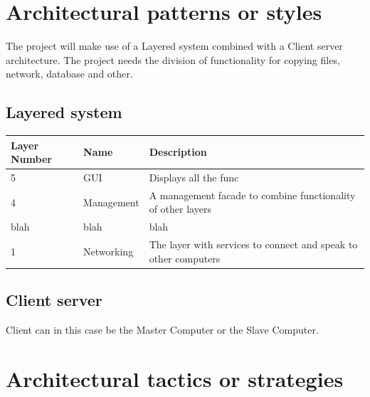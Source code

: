 \documentclass[a4paper,12pt,final]{article}
\begin{document}
\section{Architectural patterns or styles}
The project will make use of a Layered system combined with a Client server architecture. The project  needs the division of functionality for copying files, network, database and other.
\vspace{6pt}\newline
\subsection{Layered system}
\begin{tabular}{|l|l|p{8cm}|}   
\hline
Layer Number & Name & Description\\
\hline
5 & GUI & Displays all the func\\
\hline
4 & Management & A management facade to combine functionality of other layers\\
\hline
blah & blah & blah\\
\hline
1 & Networking & The layer with services to connect and speak to other computers\\
\hline
\end{tabular}

\subsection{Client server}
Client can in this case be the Master Computer or the Slave Computer. 

\section{Architectural tactics or strategies}
\end{document}
